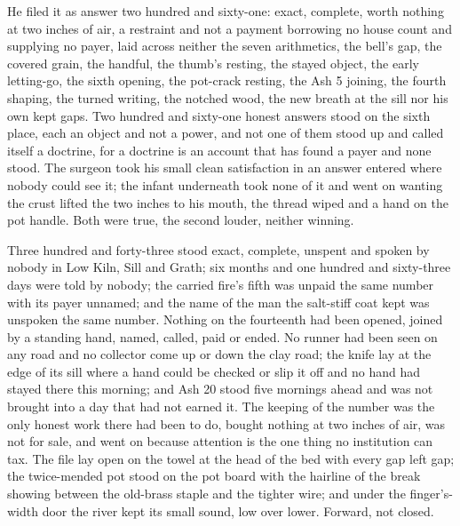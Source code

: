He filed it as answer two hundred and sixty-one: exact, complete, worth nothing at two inches of air, a restraint and not a payment borrowing no house count and supplying no payer, laid across neither the seven arithmetics, the bell's gap, the covered grain, the handful, the thumb's resting, the stayed object, the early letting-go, the sixth opening, the pot-crack resting, the Ash 5 joining, the fourth shaping, the turned writing, the notched wood, the new breath at the sill nor his own kept gaps. Two hundred and sixty-one honest answers stood on the sixth place, each an object and not a power, and not one of them stood up and called itself a doctrine, for a doctrine is an account that has found a payer and none stood. The surgeon took his small clean satisfaction in an answer entered where nobody could see it; the infant underneath took none of it and went on wanting the crust lifted the two inches to his mouth, the thread wiped and a hand on the pot handle. Both were true, the second louder, neither winning.

Three hundred and forty-three stood exact, complete, unspent and spoken by nobody in Low Kiln, Sill and Grath; six months and one hundred and sixty-three days were told by nobody; the carried fire's fifth was unpaid the same number with its payer unnamed; and the name of the man the salt-stiff coat kept was unspoken the same number. Nothing on the fourteenth had been opened, joined by a standing hand, named, called, paid or ended. No runner had been seen on any road and no collector come up or down the clay road; the knife lay at the edge of its sill where a hand could be checked or slip it off and no hand had stayed there this morning; and Ash 20 stood five mornings ahead and was not brought into a day that had not earned it. The keeping of the number was the only honest work there had been to do, bought nothing at two inches of air, was not for sale, and went on because attention is the one thing no institution can tax. The file lay open on the towel at the head of the bed with every gap left gap; the twice-mended pot stood on the pot board with the hairline of the break showing between the old-brass staple and the tighter wire; and under the finger's-width door the river kept its small sound, low over lower. Forward, not closed.
